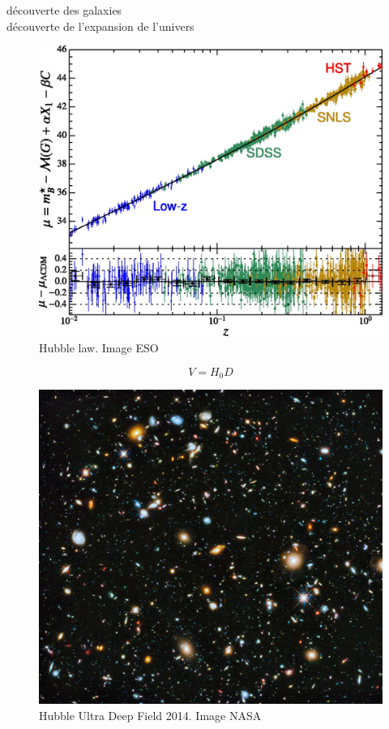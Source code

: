 découverte des galaxies\\
découverte de l'expansion de l'univers


\begin{figure}[bth]
        \includegraphics[width=.95\linewidth]{img/01/hubble_law.jpg} 
        \caption{Hubble law. 
        Image ESO}
 		\label{fig:hubble_law}
\end{figure}

\begin{equation}
V = H_0 D
\end{equation}


\begin{figure}[bth]
        \includegraphics[width=.95\linewidth]{img/01/hudf.jpeg} 
        \caption{Hubble Ultra Deep Field 2014. 
        Image NASA}
 		\label{fig:hubbl_deep_field}
\end{figure}

